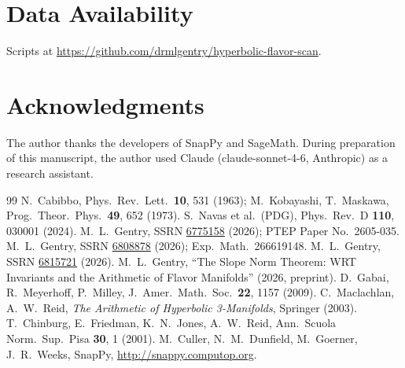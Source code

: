 \documentclass[11pt,a4paper]{article}
\theoremstyle{remark}
\begin{document}
\section*{Data Availability}
Scripts at \url{https://github.com/drmlgentry/hyperbolic-flavor-scan}.

\section*{Acknowledgments}
The author thanks the developers of SnapPy and SageMath.
During preparation of this manuscript, the author used Claude
(claude-sonnet-4-6, Anthropic) as a research assistant.

\begin{thebibliography}{99}
N.~Cabibbo, Phys.\ Rev.\ Lett.\ \textbf{10}, 531 (1963);
M.~Kobayashi, T.~Maskawa, Prog.\ Theor.\ Phys.\ \textbf{49}, 652 (1973).
S.~Navas et al.\ (PDG), Phys.\ Rev.\ D \textbf{110}, 030001 (2024).
M.~L.~Gentry, SSRN \href{https://doi.org/10.2139/ssrn.6775158}{6775158}
(2026); PTEP Paper No.\ 2605-035.
M.~L.~Gentry, SSRN \href{https://doi.org/10.2139/ssrn.6808878}{6808878}
(2026); Exp.\ Math.\ 266619148.
M.~L.~Gentry, SSRN \href{https://doi.org/10.2139/ssrn.6815721}{6815721}
(2026).
M.~L.~Gentry, ``The Slope Norm Theorem: WRT Invariants and the
Arithmetic of Flavor Manifolds'' (2026, preprint).
D.~Gabai, R.~Meyerhoff, P.~Milley,
J.\ Amer.\ Math.\ Soc.\ \textbf{22}, 1157 (2009).
C.~Maclachlan, A.~W.~Reid,
\emph{The Arithmetic of Hyperbolic 3-Manifolds}, Springer (2003).
T.~Chinburg, E.~Friedman, K.~N.~Jones, A.~W.~Reid,
Ann.\ Scuola Norm.\ Sup.\ Pisa \textbf{30}, 1 (2001).
M.~Culler, N.~M.~Dunfield, M.~Goerner, J.~R.~Weeks,
SnapPy, \url{http://snappy.computop.org}.
\end{thebibliography}
\end{document}
